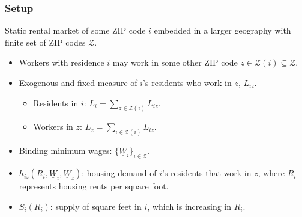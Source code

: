 \documentclass[aspectratio=169, t]{beamer}
\newcommand{\Z}{\mathcal{Z}}
\newcommand{\MW}{\underline{W}}
\begin{document}
\begin{frame}
    \frametitle{Setup}
    
    Static rental market of some ZIP code $i$ embedded in a larger geography with finite
    set of ZIP codes $\Z$.    
    \begin{itemize}
        \vspace{2mm}
        \item Workers with residence $i$ may work in some other ZIP code $z\in\Z(i)\subseteq\Z$.

        \pause
        \vspace{2mm}
        \item Exogenous and fixed measure of $i$'s residents who work in $z$, $L_{iz}$.
        \begin{itemize}
            \item Residents in $i$: $L_i = \sum_{z \in \Z(i)} L_{iz}$.
            \item Workers in $z$: $L_z = \sum_{i \in \Z(i)} L_{iz}$.
        \end{itemize}
    
        \pause
        \vspace{2mm}
        \item Binding minimum wages: $\{\MW_i\}_{i\in\Z}$.
        
        \pause
        \vspace{2mm}
        \item $h_{i z} (R_i, \MW_i, \MW_z)$: housing demand of $i$'s residents that work in $z$, where $R_i$ 
        represents housing rents per square foot.

        \pause
        \vspace{2mm}
        \item $S_i \left(R_i \right)$: supply of square feet in $i$, which is increasing in $R_i$.

    \end{itemize}
\end{frame}
\end{document}
